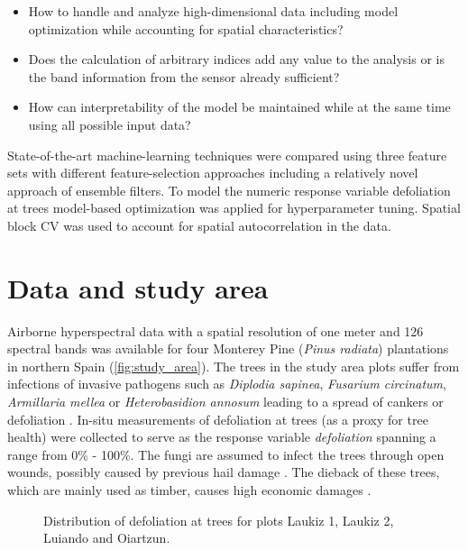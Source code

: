 \documentclass[review]{elsarticle}
\begin{document}
\begin{itemize}
	\item How to handle and analyze high-dimensional data including model optimization while accounting for spatial characteristics?
	\item Does the calculation of arbitrary indices add any value to the analysis or is the band information from the sensor already sufficient?
	\item How can interpretability of the model be maintained while at the same time using all possible input data?
\end{itemize}

\noindent State-of-the-art machine-learning techniques were compared using three feature sets with different feature-selection approaches including a relatively novel approach of ensemble filters.
To model the numeric response variable defoliation at trees model-based optimization was applied for hyperparameter tuning.
Spatial block \ac{CV} was used to account for spatial autocorrelation in the data.

\section{Data and study area}
\noindent Airborne hyperspectral data with a spatial resolution of one meter and 126 spectral bands was available for four Monterey Pine (\textit{Pinus radiata}) plantations in northern Spain (\autoref{fig:study_area}).
The trees in the study area plots suffer from infections of invasive pathogens such as \textit{Diplodia sapinea}, \textit{Fusarium circinatum}, \textit{Armillaria mellea} or \textit{Heterobasidion annosum} leading to a spread of cankers or defoliation \citep{mesanza2016, iturritxa2017}.
In-situ measurements of defoliation at trees (as a proxy for tree health) were collected to serve as the response variable \textit{defoliation} spanning a range from 0\% - 100\%.
The fungi are assumed to infect the trees through open wounds, possibly caused by previous hail damage \citep{iturritxa2014}.
The dieback of these trees, which are mainly used as timber, causes high economic damages \citep{ganley2009}.

\begin{figure} [t!]
\begin{center}
\caption{Distribution of defoliation at trees for plots Laukiz 1, Laukiz 2, Luiando and Oiartzun.}
\label{fig:defol-distr}
\end{center}
\end{figure}
\end{document}
